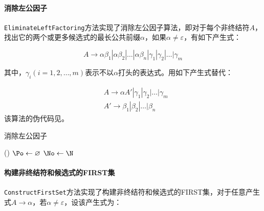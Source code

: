 \documentclass[lang=cn,11pt,a4paper,cite=authornum]{paper}
\begin{document}
\paragraph{消除左公因子} \texttt{EliminateLeftFactoring}方法实现了消除左公因子算法，即对于每个非终结符$A$，找出它的两个或更多候选式的最长公共前缀$\alpha$，如果$\alpha\not=\varepsilon$，有如下产生式：

$$
A\rightarrow \alpha\beta_1|\alpha\beta_2|\ldots|\alpha\beta_n|\gamma_1|\gamma_2|\ldots|\gamma_m
$$

其中，$\gamma_i(i=1,2,\ldots,m)$表示不以$\alpha$打头的表达式。用如下产生式替代：

$$
\begin{aligned}
& A\rightarrow \alpha A'|\gamma_1|\gamma_2|\ldots|\gamma_m \\
& A'\rightarrow \beta_1|\beta_2|\ldots|\beta_n
\end{aligned}
$$
该算法的伪代码见。

\begin{algorithm}[!htb]
    \caption{消除左公因子\label{algo:eli_left_fact}}
    \Fn(){\EliLeftFact{}}{
        $\Po\leftarrow \varnothing$\;
        $\No\leftarrow \N$\;
    }
\end{algorithm}

\paragraph{构建非终结符和候选式的FIRST集} \texttt{ConstructFirstSet}方法实现了构建非终结符和候选式的FIRST集，对于任意产生式$A\rightarrow\alpha$，若$\alpha\not=\varepsilon$，设该产生式为：
\end{document}
